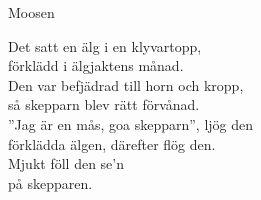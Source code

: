\begin{song}{Moosen}
	

	
	
	Det satt en älg i en klyvartopp,\\
	förklädd i älgjaktens månad.\\
	Den var befjädrad till horn och kropp,\\
	så skepparn blev rätt förvånad.\\
	''Jag är en mås, goa skepparn'', ljög den\\
	förklädda älgen, därefter flög den.\\
	Mjukt föll den se'n\\
	på skepparen.
	
\end{song}
